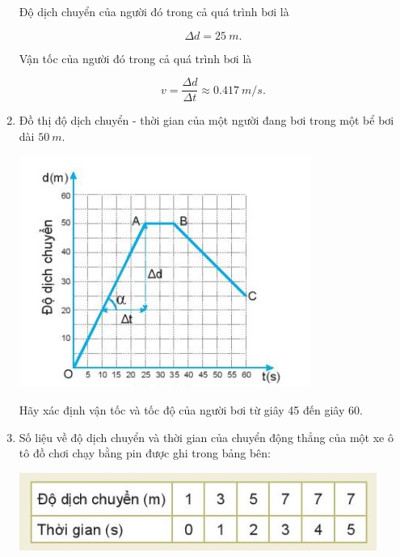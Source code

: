 \begin{enumerate}[label=\bfseries Câu \arabic*:]
{		Độ dịch chuyển của người đó trong cả quá trình bơi là
		
		$$\Delta d = \SI{25}{m}.$$
		
		Vận tốc của người đó trong cả quá trình bơi là
		
		$$v = \dfrac{\Delta d}{\Delta t} \approx \SI{0,417}{m/s}.$$
		
		

	
	}
		\item {}
	
	{
		Đồ thị độ dịch chuyển - thời gian của một người đang bơi trong một bể bơi dài $\SI{50}{m}$. 
		\begin{center}
			\includegraphics[scale=1]{../figs/VN10-2022-PH-TP006-2.jpg}
		\end{center}
	}
	Hãy xác định vận tốc và tốc độ của người bơi từ giây 45 đến giây 60.
		\item {}
	
	{
		Số liệu về độ dịch chuyển và thời gian của chuyển động thẳng của một xe ô tô đồ chơi chạy bằng pin được ghi trong bảng bên: 
		\begin{center}
			\includegraphics[scale=1]{../figs/VN10-2022-PH-TP006-3.jpg}
		\end{center}
	
}
\end{enumerate}
